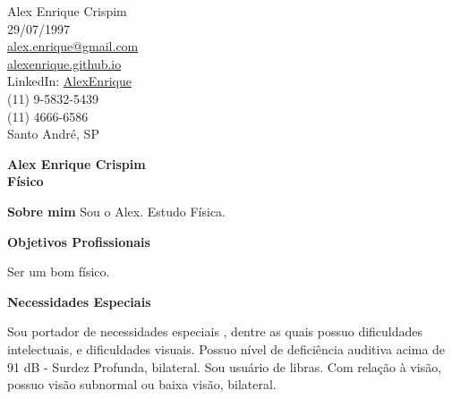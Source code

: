 \documentclass[a4paper,12pt,final]{memoir}
\newcommand{\Sep}{\vspace{1.5em}}
\newcommand{\SmallSep}{\vspace{0.5em}}
\newenvironment{AboutMe}
	{\ignorespaces\textbf{\color{RoyalBlue} Sobre mim}}
	{\Sep\ignorespacesafterend}
\newcommand{\CVSection}[1]
	{\Large\textbf{#1}\par
	\SmallSep\normalsize\normalfont}
\begin{document}
\begin{figure}
	\hfill
	\vspace{-7cm}
\end{figure}

\begin{flushright}\small
	Alex Enrique Crispim\\ 
  29/07/1997\\ 
\vspace*{1.5mm} 
	\url{alex.enrique@gmail.com}  \\ 
	\url{alexenrique.github.io} \\ 
\vspace*{1.5mm} 
LinkedIn:	\url{AlexEnrique} \\ 
\vspace*{1.5mm} 
(11) 9-5832-5439\\ 
(11) 4666-6586\\ 
\SmallSep
Santo André, SP\end{flushright}\normalsize
\framebreak



\Huge\bfseries {\color{RoyalBlue} Alex Enrique Crispim} \\ 
\Large\bfseries  Físico \\ 

\normalsize\normalfont

\begin{AboutMe}
Sou o Alex.
Estudo Física.
\end{AboutMe}


\CVSection{Objetivos Profissionais}

Ser um bom físico.


\CVSection{Necessidades Especiais}
Sou portador de necessidades especiais
, dentre as quais possuo dificuldades intelectuais,  e dificuldades visuais. Possuo nível de deficiência auditiva acima de 91 dB - Surdez Profunda, bilateral. Sou usuário de libras. Com relação à visão, possuo visão subnormal ou baixa visão, bilateral. 
\end{document}
